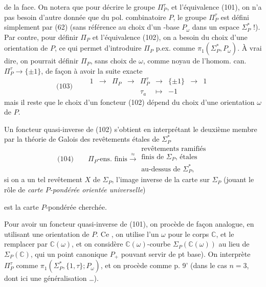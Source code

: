 \documentclass[11pt,a4paper]{article}
\begin{document}
de la face. On notera que pour décrire le groupe $\Pi_P^\tau$, et l'équivalence (101), on n'a pas besoin d'autre donnée que du pol. combinatoire $P$, le groupe $\Pi_P^\tau$ est défini simplement par (62) (sans référence au choix d'un -base $P_\omega$ dans un espace $\Sigma_P^*$ !). Par contre, pour définir $\Pi_P$ et l'équivalence (102), on a besoin du choix d'une orientation  de $P$, ce qui permet d'introduire $\Pi_P$ p.ex. comme $\pi_1(\Sigma_P^*, P_\omega)$. À vrai dire, on pourrait définir $\Pi_P$, sans choix de $\omega$, comme noyau de l'homom. can. $\Pi_P^\tau \to \{\pm 1\}$, de façon à avoir la suite exacte
\[
  \text{(103)}\qquad
  \begin{array}{ccccccccc}
    1 & \to & \Pi_P & \to & \Pi_P^\tau & \longrightarrow & \{\pm 1\} & \longrightarrow & 1 \\
      &     &       &     & \tau_a & \longmapsto & -1 & &
  \end{array}
\]
mais il reste que le choix d'un foncteur (102) dépend du choix d'une orientation $\omega$ de $P$.

Un foncteur quasi-inverse de (102) s'obtient en interprétant le deuxième membre par la théorie de Galois des revêtements étales de $\Sigma_P^*$
\[
  \text{(104)}\qquad
  \Pi_P\text{-ens. finis} \xrightarrow{\ \approx\ }
  \begin{array}{l}\text{revêtements ramifiés}\\ \text{finis de } \Sigma_P \text{, étales}\\ \text{au-dessus de } \Sigma_P^* ,\end{array}
\]
si on a un tel revêtement \struck{\ill{}} $X$ de $\Sigma_P$, l'image inverse de la carte \struck{\ill{}}  sur $\Sigma_P$ (jouant le rôle de \emph{carte $P$-pondérée orientée universelle})

est la carte $P$-pondérée   cherchée.

Pour avoir un foncteur quasi-inverse de (101), on procède de façon analogue, en utilisant une orientation de $P$. Ce , on utilise l'un $\omega$ pour  le corps $\mathbb{C}$, et le remplacer par $\mathbb{C}(\omega)$, et on considère  $\mathbb{C}(\omega)$-courbe $\Sigma_P(\mathbb{C}(\omega))$ au lieu de $\Sigma_P(\mathbb{C})$, qui   un point canonique $P_+$ pouvant servir de pt base). On  interprète $\Pi_P^\tau$ comme $\pi_1(\Sigma_P^*, \{1,\tau\} ; P_\omega)$, et on procède comme p. 9' (dans le cas $n=3$, dont \ill{} ici une généralisation …).
\end{document}

